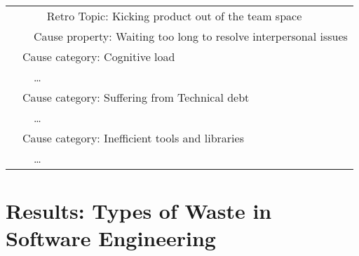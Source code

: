 \begin{table}[h]
\begin{tabular}{|llll|}
    &     &      & Retro Topic: Kicking product out of the team space \\
    &     & \multicolumn{2}{l|}{Cause property: Waiting too long to resolve interpersonal issues} \\
    & \multicolumn{3}{l|}{Cause category: Cognitive load}          \\
    &     & \multicolumn{2}{l|}{\dots} \\
    & \multicolumn{3}{l|}{Cause category: Suffering from Technical debt}          \\
    &     & \multicolumn{2}{l|}{\dots} \\
    & \multicolumn{3}{l|}{Cause category: Inefficient tools and libraries}          \\
    &     & \multicolumn{2}{l|}{\dots} \\
\hline
\end{tabular}
\end{table}


\section{Results: Types of Waste in Software Engineering}


